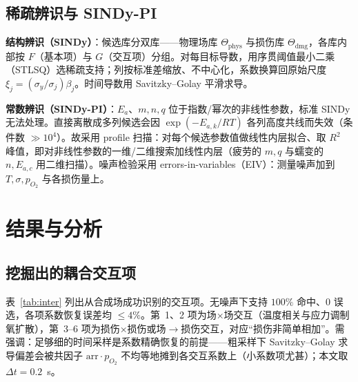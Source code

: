 \documentclass[11pt,a4paper]{article}
\begin{document}
\subsection{稀疏辨识与 SINDy-PI}
\textbf{结构辨识（SINDy）}：候选库分双库——物理场库 $\Theta_{\mathrm{phys}}$ 与损伤库 $\Theta_{\mathrm{dmg}}$，各库内部按 $F$（基本项）与 $G$（交互项）分组。对每目标导数，用序贯阈值最小二乘（STLSQ）选稀疏支持；列按标准差缩放、不中心化，系数换算回原始尺度 $\xi_j=(\sigma_y/\sigma_j)\beta_j$。时间导数用 Savitzky--Golay 平滑求导。

\textbf{常数辨识（SINDy-PI）}：$E_a$、$m,n,q$ 位于指数/幂次的非线性参数，标准 SINDy 无法处理。直接离散成多列候选会因 $\exp(-E_{a,k}/RT)$ 各列高度共线而失效（条件数 $\gg 10^4$）。故采用 profile 扫描：对每个候选参数值做线性内层拟合、取 $R^2$ 峰值，即对非线性参数的一维/二维搜索加线性内层（疲劳的 $m,q$ 与蠕变的 $n,E_{a,c}$ 用二维扫描）。噪声检验采用 errors-in-variables（EIV）：测量噪声加到 $T,\sigma,p_{O_2}$ 与各损伤量上。

\section{结果与分析}

\subsection{挖掘出的耦合交互项}
表~\ref{tab:inter} 列出从合成场成功识别的交互项。无噪声下支持 $100\%$ 命中、$0$ 误选，各项系数恢复误差均 $\le 4\%$。第~1、2 项为场×场交互（温度相关与应力调制氧扩散），第~3--6 项为损伤×损伤或场$\to$损伤交互，对应“损伤非简单相加”。需强调：足够细的时间采样是系数精确恢复的前提——粗采样下 Savitzky--Golay 求导偏差会被共因子 $\mathrm{arr}\cdot p_{O_2}$ 不均等地摊到各交互系数上（小系数项尤甚）；本文取 $\Delta t{=}0.2$~s。
\end{document}
